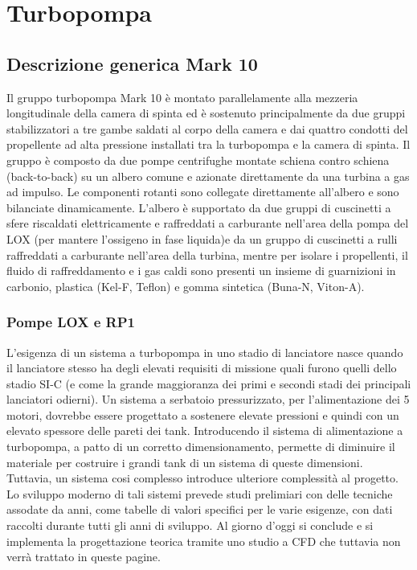 \section{Turbopompa}
\label{sec:turbopompa}

\subsection{Descrizione generica Mark 10}
\label{subsec:descrizione mark 10}

Il gruppo turbopompa Mark 10 è montato parallelamente alla mezzeria longitudinale della camera di spinta ed è sostenuto principalmente da due gruppi stabilizzatori a tre gambe saldati al corpo della camera e dai quattro condotti del propellente ad alta pressione installati tra la turbopompa e la camera di spinta. 
Il gruppo è composto da due pompe centrifughe montate schiena contro schiena (back-to-back) su un albero comune e azionate direttamente da una turbina a gas ad impulso.
Le componenti rotanti sono collegate direttamente all'albero e sono bilanciate dinamicamente.
L'albero è supportato da due gruppi di cuscinetti a sfere riscaldati elettricamente e raffreddati a carburante nell'area della pompa del LOX (per mantere l'ossigeno in fase liquida)e da un gruppo di cuscinetti a rulli raffreddati a carburante nell'area della turbina, mentre per isolare i propellenti, il fluido di raffreddamento e i gas caldi sono presenti un insieme di guarnizioni in carbonio, plastica (Kel-F, Teflon) e gomma sintetica (Buna-N, Viton-A).

\subsubsection{Pompe LOX e RP1}

L'esigenza di un sistema a turbopompa in uno stadio di lanciatore nasce quando il lanciatore stesso ha degli elevati requisiti di missione quali furono quelli dello stadio SI-C (e come la grande maggioranza dei primi e secondi stadi dei principali lanciatori odierni). Un sistema a serbatoio pressurizzato, per l'alimentazione dei 5 motori, dovrebbe essere progettato a sostenere elevate pressioni e quindi con un elevato spessore delle pareti dei tank. Introducendo il sistema di alimentazione a turbopompa, a patto di un corretto dimensionamento, permette di diminuire il materiale per costruire i grandi tank di un sistema di queste dimensioni.
Tuttavia, un sistema cosi complesso introduce ulteriore complessità al progetto. Lo sviluppo moderno di tali sistemi prevede studi prelimiari con delle tecniche assodate da anni, come tabelle di valori specifici per le varie esigenze, con dati raccolti durante tutti gli anni di sviluppo. Al giorno d'oggi si conclude e si implementa la progettazione teorica tramite uno studio a CFD che tuttavia non verrà trattato in queste pagine. 

